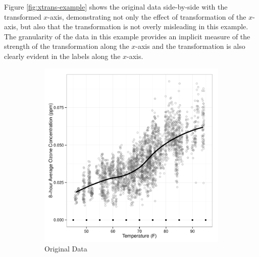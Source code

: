 \documentclass[11pt]{isuthesis}\usepackage[]{graphicx}\usepackage[]{color}
\begin{document}
Figure \ref{fig:xtrans-example} shows the original data side-by-side with the transformed $x$-axis, demonstrating not only the effect of transformation of the $x$-axis, but also that the transformation is not overly misleading in this example. The granularity of the data in this example provides an implicit measure of the strength of the transformation along the $x$-axis and the transformation is also clearly evident in the labels along the $x$-axis. 
%
\begin{figure}[h!]\centering
\begin{subfigure}[b]{.48\textwidth}\centering
\includegraphics[keepaspectratio=TRUE,width=\textwidth]{fig-xtrans-example1}
\caption{Original Data}\label{fig:xtrans-example-original}
\end{subfigure}
\begin{subfigure}[b]{.48\textwidth}\centering

\end{subfigure}
\end{figure}
\end{document}
